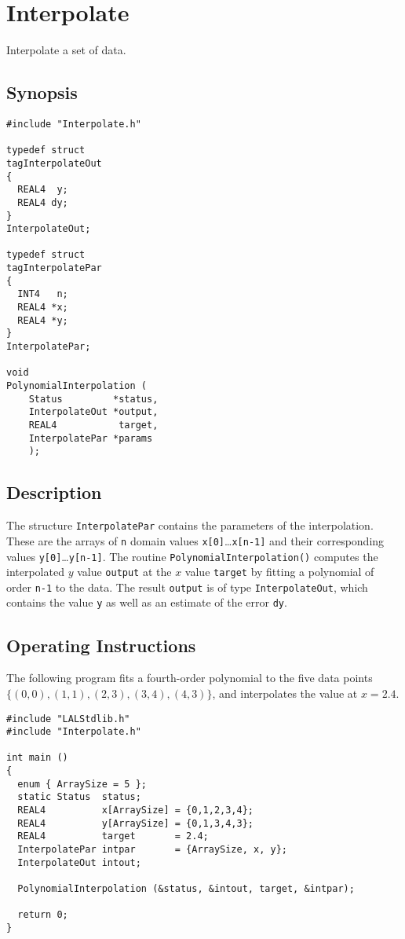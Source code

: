 \documentclass{article}
\begin{document}
\section{Interpolate}

Interpolate a set of data.

\subsection{Synopsis}
\begin{verbatim}
#include "Interpolate.h"

typedef struct
tagInterpolateOut
{
  REAL4  y;
  REAL4 dy;
}
InterpolateOut;

typedef struct
tagInterpolatePar
{
  INT4   n;
  REAL4 *x;
  REAL4 *y;
}
InterpolatePar;

void
PolynomialInterpolation (
    Status         *status,
    InterpolateOut *output,
    REAL4           target,
    InterpolatePar *params
    );
\end{verbatim}

\subsection{Description}

The structure \verb+InterpolatePar+ contains the parameters of the
interpolation.  These are the arrays of \verb+n+ domain values
\verb+x[0]+\ldots\verb+x[n-1]+ and their corresponding values
\verb+y[0]+\ldots\verb+y[n-1]+.  The routine \verb+PolynomialInterpolation()+
computes the interpolated $y$ value \verb+output+ at the $x$ value
\verb+target+ by fitting a polynomial of order \verb+n-1+ to the data.  The
result \verb+output+ is of type \verb+InterpolateOut+, which contains the
value \verb+y+ as well as an estimate of the error \verb+dy+.

\subsection{Operating Instructions}

The following program fits a fourth-order polynomial to the five data points
$\{(0,0),(1,1),(2,3),(3,4),(4,3)\}$, and interpolates the value at $x=2.4$.

\begin{verbatim}
#include "LALStdlib.h"
#include "Interpolate.h"

int main ()
{
  enum { ArraySize = 5 };
  static Status  status;
  REAL4          x[ArraySize] = {0,1,2,3,4};
  REAL4          y[ArraySize] = {0,1,3,4,3};
  REAL4          target       = 2.4;
  InterpolatePar intpar       = {ArraySize, x, y};
  InterpolateOut intout;

  PolynomialInterpolation (&status, &intout, target, &intpar);

  return 0;
}
\end{verbatim}
\end{document}

